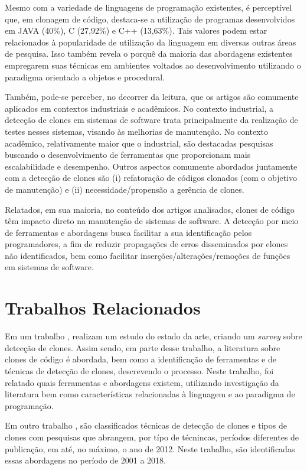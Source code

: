Mesmo com a variedade de linguagens de programação existentes, é perceptível que, em clonagem de código, destaca-se a utilização de programas desenvolvidos em JAVA (40\%), C (27,92\%) e C++ (13,63\%). Tais valores podem estar relacionados à popularidade de utilização da linguagem em diversas outras áreas de pesquisa. Isso também revela o porquê da maioria das abordagens existentes empregarem suas técnicas em ambientes voltados ao desenvolvimento utilizando o paradigma orientado a objetos e procedural. 

Também, pode-se perceber, no decorrer da leitura, que os artigos são comumente aplicados em contextos industriais e acadêmicos. No contexto industrial, a detecção de clones em sistemas de software trata principalmente da realização de testes nesses sistemas, visando às melhorias de manutenção. No contexto acadêmico, relativamente maior que o industrial, são destacadas pesquisas buscando o desenvolvimento de ferramentas que proporcionam mais escalabilidade e desempenho. Outros aspectos comumente abordados juntamente com a detecção de clones são (i) refatoração de códigos clonados (com o objetivo de manutenção) e (ii) necessidade/propensão a gerência de clones.

Relatados, em sua maioria, no conteúdo dos artigos analisados, clones de código têm impacto direto na manutenção de sistemas de software. A detecção por meio de ferramentas e abordagens busca facilitar a sua identificação pelos programadores, a fim de reduzir propagações de erros disseminados por clones não identificados, bem como facilitar inserções/alterações/remoções de funções em sistemas de software.

\section{Trabalhos Relacionados}
Em um trabalho \citeauthor{roy2007survey}, realizam um estudo do estado da arte, criando um \textit{survey} sobre detecção de clones. Assim sendo, em parte desse trabalho, a literatura sobre clones de código é abordada, bem como a identificação de ferramentas e de técnicas de detecção de clones, descrevendo o processo. Neste trabalho, foi relatado quais ferramentas e abordagens existem, utilizando investigação da literatura bem como características relacionadas à linguagem e ao paradigma de programação.

Em outro trabalho \citeauthor{gautam2016various}, são classificados técnicas de detecção de clones e tipos de clones com pesquisas que abrangem, por típo de técnincas, períodos diferentes de publicação, em até, no máximo, o ano de 2012. Neste trabalho, são identificadas essas abordagens no período de 2001 a 2018.

